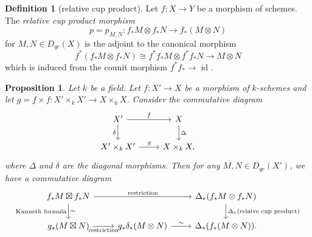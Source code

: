 \documentclass{amsart}
\numberwithin{equation}{section}
\theoremstyle{plain}
\newtheorem{proposition}[theorem]{Proposition}
\theoremstyle{definition}
\newtheorem{definition}[theorem]{Definition}
\DeclareMathOperator{\id}{\mathrm{id}}
\begin{document}
\begin{definition}[relative cup product]\label{def:relative-cup-product}
    Let $f \colon X \to Y$ be a morphism of schemes. The \emph{relative cup product morphism} $$p = p_{M, N} \colon f_*M \otimes f_*N \to f_*(M \otimes N)$$ for $M, N \in D_{qc}(X)$ is the adjoint to the canonical morphism $$f^*(f_*M \otimes f_*N) \cong f^*f_*M \otimes f^*f_*N \to M \otimes N$$ which is induced from the counit morphism $f^*f_* \to \id$.
\end{definition}
\begin{proposition}\label{prop:Kunneth-and-cup-product}
    Let $k$ be a field.
    Let $f \colon X' \to X$ be a morphism of $k$-schemes and let $g = f\times f \colon X' \times_k X' \to X \times_k X$.
    Consider the commutative diagram
    \[
        \begin{tikzcd}
            X' \arrow[r,"f"]\arrow[d, "\delta"'] & X \arrow[d,"\Delta"]&\\
            X' \times_k X' \arrow[r, "g"]& X \times_k X,
        \end{tikzcd}
    \]
    where $\Delta$ and $\delta$ are the diagonal morphisms.
    Then for any $M, N \in D_{qc}(X')$, we have a commutative diagram
    \[
        \begin{tikzcd}
            f_*M \boxtimes f_*N \arrow[rr, "\text{restriction}"]\arrow[d, "\text{Kunneth formula}"', "\sim"]&&\Delta_*(f_*M \otimes f_*N)\arrow[d, "\Delta_*(\text{relaive cup product})"]\\
            g_*(M \boxtimes N) \arrow[r, "\text{restriction}"']&g_*\delta_*(M \otimes N) \arrow[r, "\sim", sloped]&\Delta_*(f_*(M \otimes N)).
        \end{tikzcd}
    \]
\end{proposition}
\end{document}
